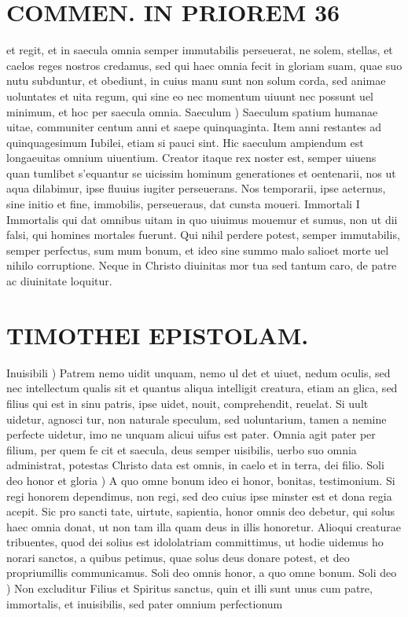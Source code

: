\documentclass{article}
\begin{document}
\begin{pages}
\section*{COMMEN. IN PRIOREM 36 }
\marginpar{[ p.36 ]}\pstart et regit, et in saecula omnia semper immutabilis perseuerat, ne solem, stellas, et caelos reges nostros credamus, sed qui haec omnia fecit in gloriam suam, quae suo nutu subduntur, et obediunt, in cuius manu sunt non solum corda, sed animae uoluntates et uita regum, qui sine eo nec momentum uiuunt nec possunt uel minimum, et hoc per saecula omnia.  \pend\pstart Saeculum ) Saeculum spatium humanae uitae, communiter centum anni et saepe quinquaginta. Item anni restantes ad quinquagesimum Iubilei, etiam si pauci sint. Hic saeculum ampiendum est longaeuitas omnium uiuentium.  \pend\pstart Creator itaque rex noster est, semper uiuens quan tumlibet s’equantur se uicissim hominum generationes et oentenarii, nos ut aqua dilabimur, ipse fluuius iugiter perseuerans. Nos temporarii, ipse aeternus, sine initio et fine, immobilis, perseueraus, dat cunsta moueri.  \pend\pstart Immortali I Immortalis qui dat omnibus uitam in quo uiuimus mouemur et sumus, non ut dii falsi, qui homines mortales fuerunt. Qui nihil perdere potest, semper immutabilis, semper perfectus, sum mum bonum, et ideo sine summo malo salioet morte uel nihilo corruptione. Neque in Christo diuinitas mor tua sed tantum caro, de patre ac diuinitate loquitur.  \pend
\section*{TIMOTHEI EPISTOLAM. }
\marginpar{[ p.37 ]}\pstart Inuisibili ) Patrem nemo uidit unquam, nemo ul det et uiuet, nedum oculis, sed nec intellectum qualis sit et quantus aliqua intelligit creatura, etiam an glica, sed filius qui est in sinu patris, ipse uidet, nouit, comprehendit, reuelat. Si uult uidetur, agnosci tur, non naturale speculum, sed uoluntarium, tamen a nemine perfecte uidetur, imo ne unquam alicui uifus est pater. Omnia agit pater per filium, per quem fe cit et saecula, deus semper uisibilis, uerbo suo omnia administrat, potestas Christo data est omnis, in caelo et in terra, dei filio.  \pend\pstart Soli deo honor et gloria ) A quo omne bonum ideo ei honor, bonitas, testimonium. Si regi honorem dependimus, non regi, sed deo cuius ipse minster est et dona regia acepit. Sic pro sancti tate, uirtute, sapientia, honor omnis deo debetur, qui solus haec omnia donat, ut non tam illa quam deus in illis honoretur. Alioqui creaturae tribuentes, quod dei solius est idololatriam committimus, ut hodie uidemus ho norari sanctos, a quibus petimus, quae solus deus donare potest, et deo propriumillis communicamus. Soli deo omnis honor, a quo omne bonum.  \pend\pstart Soli deo ) Non excluditur Filius et Spiritus sanctus, quin et illi sunt unus cum patre, immortalis, et inuisibilis, sed pater omnium perfectionum  \pend

\end{pages}
\end{document}
